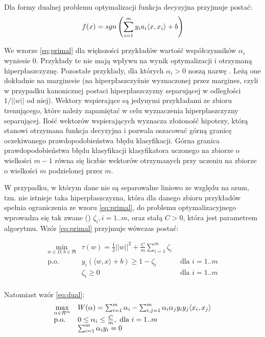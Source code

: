 Dla formy dualnej problemu optymalizacji funkcja decyzyjna przyjmuje postać:
\begin{equation}
f(x) = sgn \left( \sum_{i=1}^{m} y_i a_i \langle x, x_i \rangle + b \right)
\label{eq:decfn}
\end{equation}

We wzorze \ref{eq:primal} dla większości przykładów wartość współczynników $ \alpha_i $ wyniesie 0. Przykłady te nie mają wpływu na wynik optymalizacji i otrzymaną hiperpłaszczyznę. Pozostałe przykłady, dla których $ \alpha_i > 0 $ noszą nazwę . Leżą one dokładnie na marginesie (na hiperpłaszczyźnie wyznaczonej przez margines, czyli w przypadku kanonicznej postaci hiperpłaszczyzny separującej w odległości $ 1/||w|| $ od niej). Wektory wspierające są jedynymi przykładami ze zbioru trenującego, które należy zapamiętać w celu wyznaczenia hiperpłaszczyzny separującej. Ilość wektorów wspierających wyznacza złożoność hipotezy, którą stanowi otrzymana funkcja decyzyjna i pozwala oszacować górną granicę oczekiwanego prawdopodobieństwa błędu klasyfikacji. Górna granica prawdopodobieństwa błędu klasyfikacji klasyfikatora uczonego na zbiorze o wielkości $ m-1 $ równa się liczbie wektorów otrzymanych przy uczeniu na zbiorze o wielkości $ m $ podzielonej przez $ m $.


W przypadku, w którym dane nie są separowalne liniowo ze względu na szum, tzn. nie istnieje taka hiperpłaszczyzna, która dla danego zbioru przykładów spełnia ograniczenia ze wzoru \ref{eq:primal}, do problemu optymalizacyjnego wprowadza się tak zwane  () $ \zeta_i, i=1..m $, oraz stałą $ C > 0 $, która jest parametrem algorytmu.
Wzór \ref{eq:primal} przyjmuje wówczas postać: 

\begin{equation}
\begin{array}{lll}
\min\limits_{w \in \Omega, b \in \Re} &  \tau(w) = \frac{1}{2}||w||^2 + \frac{C}{m} \sum_{i=1}^{m} \zeta_i & \\
\text{p.o.} &  y_i  (\langle w, x \rangle + b) \geq 1 - \zeta_i & \text{ dla } i=1..m \\
& \zeta_i \geq 0 & \text{ dla } i=1..m \\
\end{array}
\label{eq:primal-c}
\end{equation}

Natomiast wzór \ref{eq:dual}:
\begin{equation}
\begin{array}{ll}
\max\limits_{\alpha \in R^m} & W(\alpha) = \sum_{i=1}^{m} \alpha_i - \sum_{i,j=1}^{m} \alpha_i \alpha_j y_i y_j \langle x_i, x_j \rangle \\
\text{p.o.} & 0 \leq \alpha_i \leq \frac{C}{m} , \text{ dla } i=1..m \\
& \sum_{i=1}^{m} \alpha_i y_i = 0
\end{array}
\label{eq:dual-c}
\end{equation}

